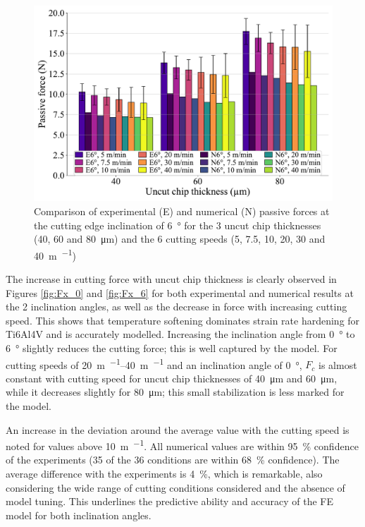 \documentclass[preprint,12pt,times]{elsarticle}
\newcommand{\snsp}[2]{{#1}_{\!#2}}    %
\begin{document}
\begin{figure}[!h]
\centering
\includegraphics[width = 140 mm]{Figures/Fz_6}
\caption{Comparison of experimental (E) and numerical (N) passive forces at the cutting edge inclination of \qty{6}{\degree} for the 3 uncut chip thicknesses (40, 60 and \qty{80}{\um}) and the 6 cutting speeds (5, 7.5, 10, 20, 30 and \qty{40}{\m\per\min})}
\label{fig:Fz_6}
\end{figure}

The increase in cutting force with uncut chip thickness is clearly observed in Figures \ref{fig:Fx_0} and \ref{fig:Fx_6} for both experimental and numerical results at the 2 inclination angles, as well as the decrease in force with increasing cutting speed. This shows that temperature softening dominates strain rate hardening for Ti6Al4V and is accurately modelled. Increasing the inclination angle from \qty{0}{\degree} to \qty{6}{\degree} slightly reduces the cutting force; this is well captured by the model. For cutting speeds of \qtyrange{20}{40}{\m\per\min} and an inclination angle of \qty{0}{\degree}, $\snsp{F}{c}$ is almost constant with cutting speed for uncut chip thicknesses of \qty{40}{\um} and \qty{60}{\um}, while it decreases slightly for \qty{80}{\um}; this small stabilization is less marked for the model.

An increase in the deviation around the average value with the cutting speed is noted for values above \qty{10}{\m\per\min}. All numerical values are within \qty{95}{\%} confidence of the experiments (35 of the 36 conditions are within \qty{68}{\%} confidence). The average difference with the experiments is \qty{4}{\%}, which is remarkable, also considering the wide range of cutting conditions considered and the absence of model tuning. This underlines the predictive ability and accuracy of the FE model for both inclination angles.
\end{document}
